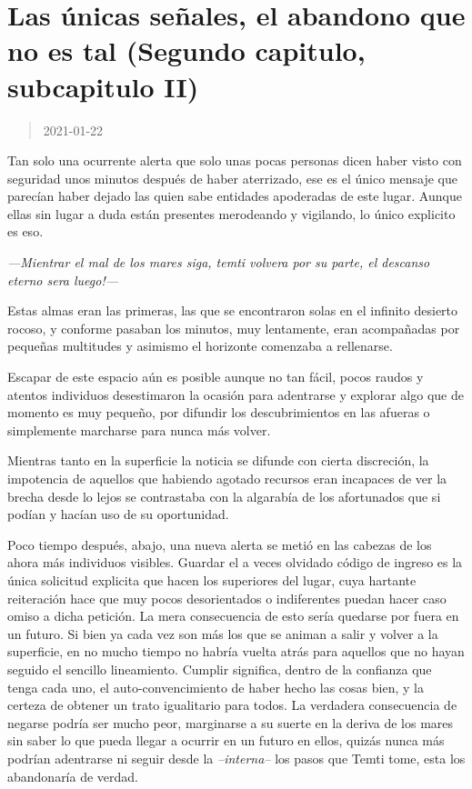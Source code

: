 \documentclass[
  spanish,
]{book}
\begin{document}
\hypertarget{las-uxfanicas-seuxf1ales-el-abandono-que-no-es-tal-segundo-capitulo-subcapitulo-ii}{%
\section{Las únicas señales, el abandono que no es tal (Segundo capitulo, subcapitulo II)}\label{las-uxfanicas-seuxf1ales-el-abandono-que-no-es-tal-segundo-capitulo-subcapitulo-ii}}

\begin{quote}
2021-01-22
\end{quote}

Tan solo una ocurrente alerta que solo unas pocas personas dicen haber visto con seguridad unos minutos después de haber aterrizado, ese es el único mensaje que parecían haber dejado las quien sabe entidades apoderadas de este lugar. Aunque ellas sin lugar a duda están presentes merodeando y vigilando, lo único explicito es eso.

\emph{---Mientrar el mal de los mares siga, temti volvera por su parte, el descanso eterno sera luego!---}

Estas almas eran las primeras, las que se encontraron solas en el infinito desierto rocoso, y conforme pasaban los minutos, muy lentamente, eran acompañadas por pequeñas multitudes y asimismo el horizonte comenzaba a rellenarse.

Escapar de este espacio aún es posible aunque no tan fácil, pocos raudos y atentos individuos desestimaron la ocasión para adentrarse y explorar algo que de momento es muy pequeño, por difundir los descubrimientos en las afueras o simplemente marcharse para nunca más volver.

Mientras tanto en la superficie la noticia se difunde con cierta discreción, la impotencia de aquellos que habiendo agotado recursos eran incapaces de ver la brecha desde lo lejos se contrastaba con la algarabía de los afortunados que si podían y hacían uso de su oportunidad.

Poco tiempo después, abajo, una nueva alerta se metió en las cabezas de los ahora más individuos visibles. Guardar el a veces olvidado código de ingreso es la única solicitud explicita que hacen los superiores del lugar, cuya hartante reiteración hace que muy pocos desorientados o indiferentes puedan hacer caso omiso a dicha petición. La mera consecuencia de esto sería quedarse por fuera en un futuro. Si bien ya cada vez son más los que se animan a salir y volver a la superficie, en no mucho tiempo no habría vuelta atrás para aquellos que no hayan seguido el sencillo lineamiento.
Cumplir significa, dentro de la confianza que tenga cada uno, el auto-convencimiento de haber hecho las cosas bien, y la certeza de obtener un trato igualitario para todos. La verdadera consecuencia de negarse podría ser mucho peor, marginarse a su suerte en la deriva de los mares sin saber lo que pueda llegar a ocurrir en un futuro en ellos, quizás nunca más podrían adentrarse ni seguir desde la \emph{--interna--} los pasos que Temti tome, esta los abandonaría de verdad.
\end{document}
